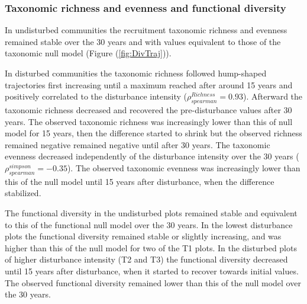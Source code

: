 \documentclass[
  11pt,
  french,
  A4paper,
  extrafontsizes,onecolumn,openright
  ]{memoir}
\begin{document}
\subsubsection{Taxonomic richness and evenness and functional
diversity}\label{taxonomic-richness-and-evenness-and-functional-diversity}

In undisturbed communities the recruitment taxonomic richness and
evenness remained stable over the 30 years and with values equivalent to
those of the taxonomic null model (Figure (\ref{fig:DivTraj})).

In disturbed communities the taxonomic richness followed hump-shaped
trajectories first increasing until a maximum reached after around 15
years and positively correlated to the disturbance intensity
(\(\rho^{Richness}_{spearman}=0.93\)). Afterward the taxonomic richness
decreased and recovered the pre-disturbance values after 30 years. The
observed taxonomic richness was increasingly lower than this of null
model for 15 years, then the difference started to shrink but the
observed richness remained negative remained negative until after 30
years. The taxonomic evenness decreased independently of the disturbance
intensity over the 30 years (\(\rho^{simpson}_{spearman}=-0.35\)). The
observed taxonomic evenness was increasingly lower than this of the null
model until 15 years after disturbance, when the difference stabilized.

The functional diversity in the undisturbed plots remained stable and
equivalent to this of the functional null model over the 30 years. In
the lowest disturbance plots the functional diversity remained stable or
slightly increasing, and was higher than this of the null model for two
of the T1 plots. In the disturbed plots of higher disturbance intensity
(T2 and T3) the functional diversity decreased until 15 years after
disturbance, when it started to recover towards initial values. The
observed functional diversity remained lower than this of the null model
over the 30 years.
\end{document}
